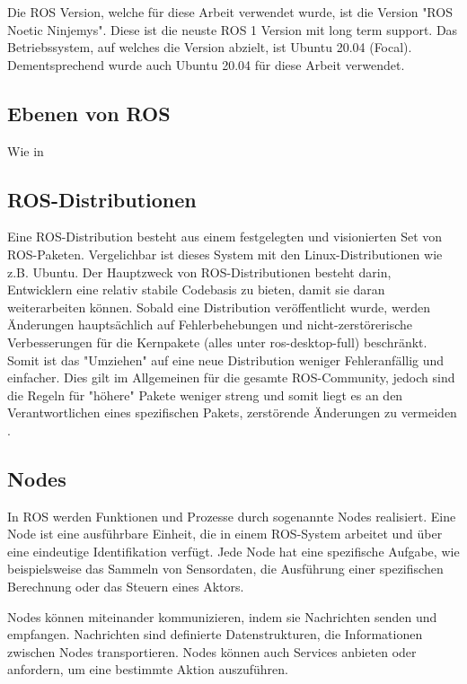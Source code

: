     Die \ac{ROS} Version, welche für diese Arbeit verwendet wurde, ist die Version "ROS Noetic Ninjemys". Diese ist die neuste ROS 1 Version mit long term support. Das Betriebssystem, auf welches die Version abzielt, ist Ubuntu 20.04 (Focal). Dementsprechend wurde auch Ubuntu 20.04 für diese Arbeit verwendet.

    \subsection{Ebenen von ROS} \label{Ebenen von ROS:subsection}
    Wie in \cite{ROSconcepts}

    \subsection{ROS-Distributionen} \label{ROS-Distributionen:subsection}
    Eine ROS-Distribution besteht aus einem festgelegten und visionierten Set von ROS-Paketen. Vergelichbar ist dieses System mit den Linux-Distributionen wie z.B. Ubuntu. Der Hauptzweck von ROS-Distributionen besteht darin, Entwicklern eine relativ stabile Codebasis zu bieten, damit sie daran weiterarbeiten können. Sobald eine Distribution veröffentlicht wurde, werden Änderungen hauptsächlich auf Fehlerbehebungen und nicht-zerstörerische Verbesserungen für die Kernpakete (alles unter ros-desktop-full) beschränkt. Somit ist das "Umziehen" auf eine neue Distribution weniger Fehleranfällig und einfacher. Dies gilt im Allgemeinen für die gesamte ROS-Community, jedoch sind die Regeln für "höhere" Pakete weniger streng und somit liegt es an den Verantwortlichen eines spezifischen Pakets, zerstörende Änderungen zu vermeiden \cite[vgl.][]{ROScontributions}.

    \subsection{Nodes} \label{nodes:subsection}
    In \ac{ROS} werden Funktionen und Prozesse durch sogenannte Nodes realisiert. Eine Node ist eine ausführbare Einheit, die in einem \ac{ROS}-System arbeitet und über eine eindeutige Identifikation verfügt. Jede Node hat eine spezifische Aufgabe, wie beispielsweise das Sammeln von Sensordaten, die Ausführung einer spezifischen Berechnung oder das Steuern eines Aktors.

    Nodes können miteinander kommunizieren, indem sie Nachrichten senden und empfangen. Nachrichten sind definierte Datenstrukturen, die Informationen zwischen Nodes transportieren. Nodes können auch Services anbieten oder anfordern, um eine bestimmte Aktion auszuführen.

